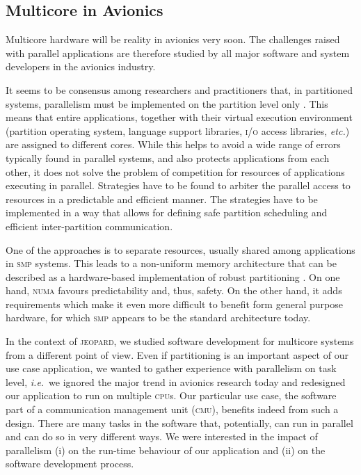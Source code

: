 \documentclass{sig-alternate}
\newcommand{\acronym}[1]{\textsc{#1}}
\newcommand{\ie}{\textit{i.e.}}
\newcommand{\etc}{\textit{etc.}}
\begin{document}
\clearpage
\subsection{Multicore in Avionics}\label{sub:multi}
Multicore hardware will be reality in avionics very soon.
The challenges raised with parallel applications
are therefore studied by all major software and system developers
in the avionics industry.

It seems to be consensus among researchers and practitioners
that, in partitioned systems, parallelism must be implemented
on the partition level only \cite{kin09}. 
This means that entire applications, 
together with their virtual execution environment 
(partition operating system, 
language support libraries, \acronym{i/o} access libraries, \etc) 
are assigned to different cores. 
While this helps to avoid a wide range of errors 
typically found in parallel systems, 
and also protects applications from each other, 
it does not solve the problem of competition 
for resources of applications executing in parallel. 
Strategies have to be found 
to arbiter the parallel access to resources 
in a predictable and efficient manner. 
The strategies have to be implemented in a way 
that allows for defining safe partition scheduling 
and efficient inter-partition communication.

One of the approaches is to separate resources,
usually shared among applications in \acronym{smp} systems.
This leads to a non-uniform memory architecture
that can be described as a hardware-based implementation 
of robust partitioning \cite{kin09}.
On one hand, \acronym{numa} 
favours predictability and, thus, safety.
On the other hand, it adds requirements 
which make it even more difficult to benefit 
form general purpose hardware, for which
\acronym{smp} appears to be the standard architecture today.

In the context of \acronym{jeopard},
we studied software development for multicore systems
from a different point of view.
Even if partitioning is an important aspect
of our use case application,
we wanted to gather experience with parallelism 
on task level, 
\ie\ we ignored the major trend in avionics research today
and redesigned our application to run on multiple \acronym{cpu}s.
Our particular use case,
the software part of 
a communication management unit (\acronym{cmu}),
benefits indeed from such a design.
There are many tasks in the software
that, potentially, can run in parallel 
and can do so in very different ways.
We were interested in the impact of parallelism
 (i) on the run-time behaviour of our application and
(ii) on the software development process.
\end{document}
